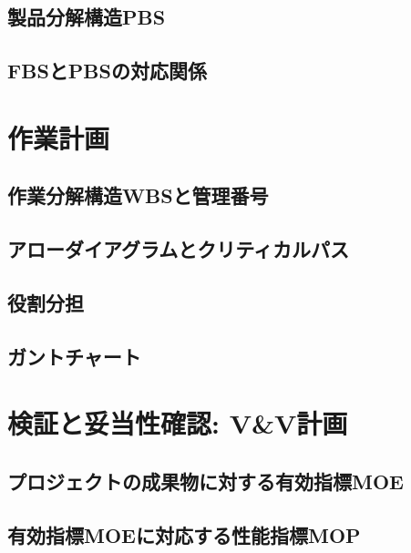 \documentclass[lualatex,book,paper=a4paper,jafontsize=11.5pt,jafontscale=1.05]{jlreq}
\begin{document}
\subsection{製品分解構造PBS}

\subsection{FBSとPBSの対応関係}


\section{作業計画}
\subsection{作業分解構造WBSと管理番号}

\subsection{アローダイアグラムとクリティカルパス}

\subsection{役割分担}

\subsection{ガントチャート}


\section{検証と妥当性確認: V\&V計画}
\subsection{プロジェクトの成果物に対する有効指標MOE}

\subsection{有効指標MOEに対応する性能指標MOP}

\end{document}
